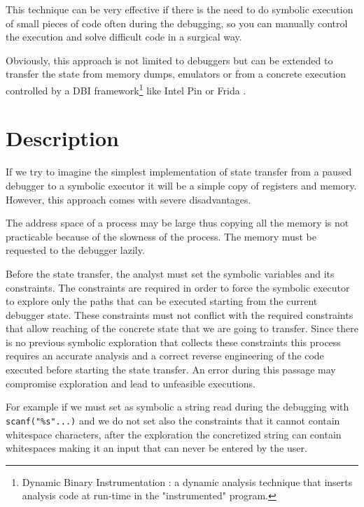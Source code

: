 This technique can be very effective if there is the need to do symbolic execution of small pieces of code often during the debugging, so you can manually control the execution and solve difficult code in a surgical way.

Obviously, this approach is not limited to debuggers but can be extended to transfer the state from memory dumps, emulators or from a concrete execution controlled by a DBI framework\footnote{Dynamic Binary Instrumentation \cite{Net:phd2004}: a dynamic analysis technique that inserts analysis code at run-time in the "instrumented" program.} like Intel Pin \cite{Pin} or Frida \cite{Frida}.

\section{Description}
\label{descr}

If we try to imagine the simplest implementation of state transfer from a paused debugger to a symbolic executor it will be a simple copy of registers and memory.
However, this approach comes with severe disadvantages.

The address space of a process may be large thus copying all the memory is not practicable because of the slowness of the process. The memory must be requested to the debugger lazily.


Before the state transfer, the analyst must set the symbolic variables and its constraints. The constraints are required in order to force the symbolic executor to explore only the paths that can be executed starting from the current debugger state.
These constraints must not conflict with the required constraints that allow reaching of the concrete state that we are going to transfer. Since there is no previous symbolic exploration that collects these constraints this process requires an accurate analysis and a correct reverse engineering of the code executed before starting the state transfer. An error during this passage may compromise exploration and lead to unfeasible executions.

For example if we must set as symbolic a string read during the debugging with \verb|scanf("%s"...)| and we do not set also the constraints that it cannot contain whitespace characters, after the exploration the concretized string can contain whitespaces making it an input that can never be entered by the user.

